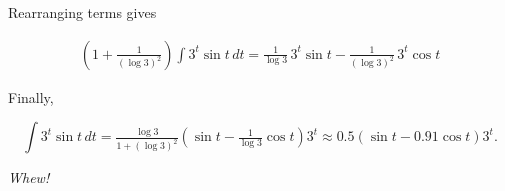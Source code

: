 \documentclass[12pt, letterpaper]{article}
\begin{document}
Rearranging terms gives

\begin{equation*}
\begin{aligned}
\left( 1 + \tfrac{1}{(\log{3})^2} \right) \int 3^{t}\sin{t} \, dt
  = \tfrac{1}{\log{3}} \, 3^t \sin{t} - \tfrac{1}{(\log{3})^2} \, 3^t \cos{t}
\end{aligned}
\end{equation*}

Finally,

\begin{equation*}
\boxed{
\int 3^{t}\sin{t} \, dt
  = \tfrac{\log{3}}{1 + (\log{3})^2} \left( \sin{t} - \tfrac{1}{\log{3}} \cos{t} \right) 3^t
  \approx 0.5 \left( \sin{t} - 0.91 \cos{t} \right)  3^t  .
}
\end{equation*}

\emph{Whew!}
\end{document}
